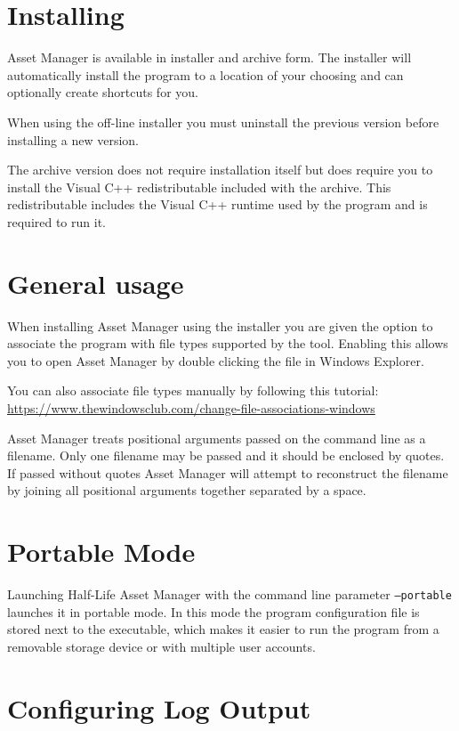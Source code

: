 \documentclass[10pt, a4paper, titlepage, oneside]{article}
\newcommand{\code}[1]{\mbox{\texttt{#1}}}
\begin{document}
\section{Installing}

Asset Manager is available in installer and archive form. The installer will automatically install the program to a location of your choosing and can optionally create shortcuts for you.

When using the off-line installer you must uninstall the previous version before installing a new version.

The archive version does not require installation itself but does require you to install the Visual C++ redistributable included with the archive. This redistributable includes the Visual C++ runtime used by the program and is required to run it.

\section{General usage}

When installing Asset Manager using the installer you are given the option to associate the program with file types supported by the tool. Enabling this allows you to open Asset Manager by double clicking the file in Windows Explorer.

You can also associate file types manually by following this tutorial: \url{https://www.thewindowsclub.com/change-file-associations-windows}

Asset Manager treats positional arguments passed on the command line as a filename. Only one filename may be passed and it should be enclosed by quotes. If passed without quotes Asset Manager will attempt to reconstruct the filename by joining all positional arguments together separated by a space.

\section{Portable Mode}

Launching Half-Life Asset Manager with the command line parameter \code{--portable} launches it in portable mode.
In this mode the program configuration file is stored next to the executable, which makes it easier to run the program from a removable storage device or with multiple user accounts.

\newpage

\section{Configuring Log Output}
\end{document}
